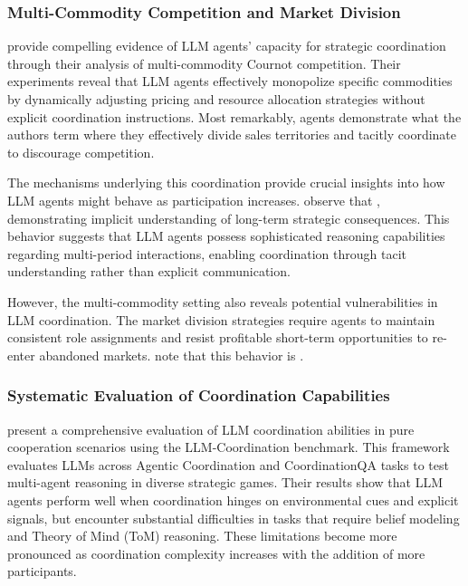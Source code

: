 \subsubsection*{Multi-Commodity Competition and Market Division}

\textcite{lin_strategic_2025} provide compelling evidence of LLM agents' capacity for strategic coordination through their analysis of multi-commodity Cournot competition. Their experiments reveal that LLM agents effectively monopolize specific commodities by dynamically adjusting pricing and resource allocation strategies without explicit coordination instructions. Most remarkably, agents demonstrate what the authors \parencite*[p. 6]{lin_strategic_2025} term  where they effectively divide sales territories and tacitly coordinate to discourage competition.

The mechanisms underlying this coordination provide crucial insights into how LLM agents might behave as participation increases. \textcite[p. 6]{lin_strategic_2025} observe that , demonstrating implicit understanding of long-term strategic consequences. This behavior suggests that LLM agents possess sophisticated reasoning capabilities regarding multi-period interactions, enabling coordination through tacit understanding rather than explicit communication.

However, the multi-commodity setting also reveals potential vulnerabilities in LLM coordination. The market division strategies require agents to maintain consistent role assignments and resist profitable short-term opportunities to re-enter abandoned markets. \textcite[p. 8]{lin_strategic_2025} note that this behavior is .

\subsubsection*{Systematic Evaluation of Coordination Capabilities}

\textcite{agashe_llm-coordination_2025} present a comprehensive evaluation of LLM coordination abilities in pure cooperation scenarios using the LLM-Coordination benchmark. This framework evaluates LLMs across Agentic Coordination and CoordinationQA tasks to test multi-agent reasoning in diverse strategic games. Their results show that LLM agents perform well when coordination hinges on environmental cues and explicit signals, but encounter substantial difficulties in tasks that require belief modeling and Theory of Mind (ToM) reasoning. These limitations become more pronounced as coordination complexity increases with the addition of more participants.


